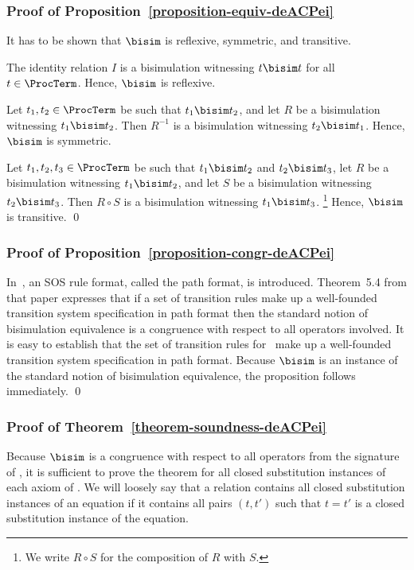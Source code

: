 \documentclass[runningheads]{llncs}
\begin{document}
\subsubsection*{Proof of Proposition~\ref{proposition-equiv-deACPei}}
It has to be shown that $\bisim$ is reflexive, symmetric, and 
transitive.

The identity relation $I$ is a bisimulation witnessing $t \bisim t$ for 
all $t \in \ProcTerm$.
Hence, $\bisim$ is reflexive.

Let $t_1, t_2 \in \ProcTerm$ be such that $t_1 \bisim t_2$, and
let $R$ be a bisimulation witnessing $t_1 \bisim t_2$.
Then $R^{-1}$ is a bisimulation witnessing $t_2 \bisim t_1$.
Hence, $\bisim$ is symmetric.

Let $t_1, t_2, t_3 \in \ProcTerm$ be such that $t_1 \bisim t_2$ and
$t_2 \bisim t_3$, 
let $R$ be a bisimulation witnessing $t_1 \bisim t_2$, and 
let $S$ be a bisimulation witnessing $t_2 \bisim t_3$.
Then $R \circ S$ is a bisimulation witnessing 
$t_1 \bisim t_3$.%
\footnote{We write $R \circ S$ for the composition of $R$ with $S$.}
Hence, $\bisim$ is transitive.
\qed

\subsubsection*{Proof of Proposition~\ref{proposition-congr-deACPei}}
In~\cite{BV93a}, an SOS rule format, called the path format, is 
introduced.
Theorem~5.4 from that paper expresses that if a set of transition 
rules make up a well-founded transition system specification in path 
format then the standard notion of bisimulation equivalence is a 
congruence with respect to all operators involved.
It is easy to establish that the set of transition rules for \deACPei\ 
make up a well-founded transition system specification in path format.
Because $\bisim$ is an instance of the standard notion of bisimulation 
equivalence, the proposition follows immediately.
\qed

\subsubsection*{Proof of Theorem~\ref{theorem-soundness-deACPei}}
Because ${\bisim}$ is a congruence with respect to all operators from 
the signature of \deACPei, it is sufficient to prove the theorem for 
all closed substitution instances of each axiom of \deACPei.
%
We will loosely say that a relation contains all closed substitution 
instances of an equation if it contains all pairs $(t,t')$ such that 
$t = t'$ is a closed substitution instance of the equation.
\end{document}
